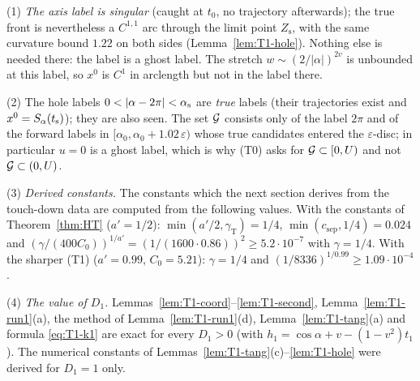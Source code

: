 \begin{remark}\label{rem:T1-assembly}
(1) \emph{The axis label is singular} (caught at $t_0$, no trajectory afterwards); the true front is nevertheless a $C^{1,1}$ arc through
the limit point $Z_{\mathrm s}$, with the same curvature bound $1.22$ on both sides (Lemma~\ref{lem:T1-hole}). Nothing else is needed
there: the label is a ghost label. The stretch $w\sim(2/|\alpha|)^{2v}$ is unbounded at this label, so $x^0$ is $C^1$ in arclength
but not in the label there.

(2) The hole labels $0<|\alpha-2\pi|<\STas$ are \emph{true} labels (their trajectories exist and $x^0=S_\alpha(t_{\mathrm s})$); they are also
seen. The set $\mathcal G$ consists only of the label $2\pi$ and of the forward labels in $[\alpha_0,\alpha_0+1.02\,\varepsilon)$ whose true
candidates entered the $\varepsilon$-disc; in particular $u=0$ is a ghost label, which is why \textup{(T0)} asks for
$\mathcal G\subset[0,U)$ and not $\mathcal G\subset(0,U)$.

(3) \emph{Derived constants.} The constants which the next section derives from the touch-down data are computed from the
following values. With the constants of Theorem~\ref{thm:HT} ($a'=1/2$): $\min(a'/2,\gamma_{\mathrm T})=1/4$,
$\min(c_{\mathrm{sep}},1/4)=0.024$ and $(\gamma/(400C_0))^{1/a'}=(1/(1600\cdot0.86))^2\ge5.2\cdot10^{-7}$ with $\gamma=1/4$. With the
sharper \textup{(T1)} ($a'=0.99$, $C_0=5.21$): $\gamma=1/4$ and $(1/8336)^{1/0.99}\ge1.09\cdot10^{-4}$.

(4) \emph{The value of $D_1$.} Lemmas~\ref{lem:T1-coord}--\ref{lem:T1-second}, Lemma~\ref{lem:T1-run1}(a), the method of
Lemma~\ref{lem:T1-run1}(d), Lemma~\ref{lem:T1-tang}(a) and formula \eqref{eq:T1-k1} are exact for every $D_1>0$ (with
$h_1=\cos\alpha+v-(1-v^2)t_1$). The numerical constants of Lemmas~\ref{lem:T1-tang}(c)--\ref{lem:T1-hole} were derived for $D_1=1$
only.
\end{remark}

